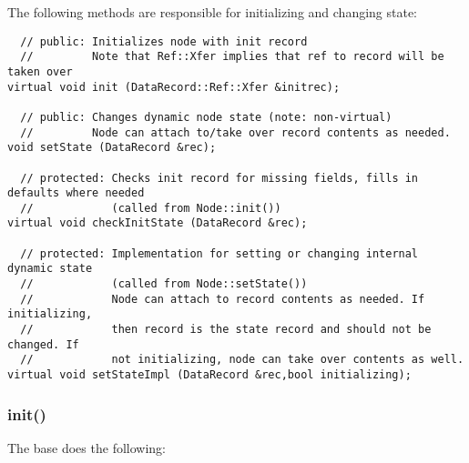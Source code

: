 \documentclass[10pt]{article}
\begin{document}
  The following methods are responsible for initializing and changing state:

\begin{verbatim}
  // public: Initializes node with init record
  //         Note that Ref::Xfer implies that ref to record will be taken over
virtual void init (DataRecord::Ref::Xfer &initrec);

  // public: Changes dynamic node state (note: non-virtual)
  //         Node can attach to/take over record contents as needed.
void setState (DataRecord &rec);

  // protected: Checks init record for missing fields, fills in defaults where needed
  //            (called from Node::init())
virtual void checkInitState (DataRecord &rec);

  // protected: Implementation for setting or changing internal dynamic state 
  //            (called from Node::setState())
  //            Node can attach to record contents as needed. If initializing,
  //            then record is the state record and should not be changed. If
  //            not initializing, node can take over contents as well.
virtual void setStateImpl (DataRecord &rec,bool initializing);
\end{verbatim}

\subsubsection{init()}

  The base  does the following:
\end{document}

